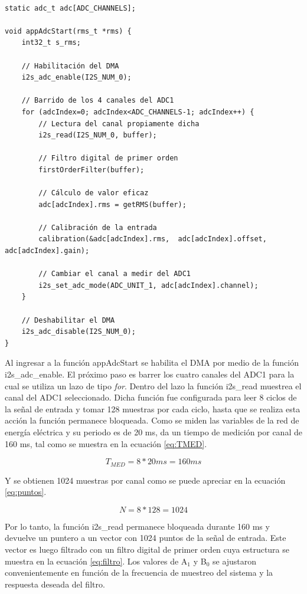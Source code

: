 \begin{lstlisting}[label=cod:adc_c,caption=Pseudocódigo del módulo adc.c.]

static adc_t adc[ADC_CHANNELS];

void appAdcStart(rms_t *rms) {
	int32_t s_rms;
	
	// Habilitación del DMA 
	i2s_adc_enable(I2S_NUM_0);

	// Barrido de los 4 canales del ADC1
	for (adcIndex=0; adcIndex<ADC_CHANNELS-1; adcIndex++) {		
		// Lectura del canal propiamente dicha
		i2s_read(I2S_NUM_0, buffer);
		
		// Filtro digital de primer orden
		firstOrderFilter(buffer);

		// Cálculo de valor eficaz
		adc[adcIndex].rms = getRMS(buffer);
		
		// Calibración de la entrada 
		calibration(&adc[adcIndex].rms,  adc[adcIndex].offset, adc[adcIndex].gain);
		
		// Cambiar el canal a medir del ADC1
		i2s_set_adc_mode(ADC_UNIT_1, adc[adcIndex].channel);
	}
	
	// Deshabilitar el DMA
	i2s_adc_disable(I2S_NUM_0);
}
\end{lstlisting}

Al ingresar a la función appAdcStart se habilita el DMA por medio de la función i2s\_adc\_enable. El próximo paso es barrer los cuatro canales del ADC1 para la cual se utiliza un lazo de tipo \textit{for}. Dentro del lazo la función i2s\_read muestrea el canal del ADC1 seleccionado. Dicha función fue configurada para leer 8 ciclos de la señal de entrada y tomar 128 muestras por cada ciclo, hasta que se realiza esta acción la función permanece bloqueada. Como se miden las variables de la red de energía eléctrica y su periodo es de 20 ms, da un tiempo de medición por canal de 160 ms, tal como se muestra en la ecuación \ref{eq:TMED}.

\begin{equation}
	\label{eq:TMED}
	T_{MED} = 8 * 20 ms = 160 ms
\end{equation}

Y se obtienen 1024 muestras por canal como se puede apreciar en la ecuación \ref{eq:puntos}.

\begin{equation}
	\label{eq:puntos}
	N = 8 * 128 = 1024
\end{equation}

Por lo tanto, la función i2s\_read permanece bloqueada durante 160 ms y devuelve un puntero a un vector con 1024 puntos de la señal de entrada. Este vector es luego filtrado con un filtro digital de primer orden cuya estructura se muestra en la ecuación \ref{eq:filtro}. Los valores de A$_{1}$ y B$_{0}$ se ajustaron convenientemente en función de la frecuencia de muestreo del sistema y la respuesta deseada del filtro.

